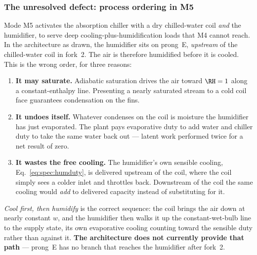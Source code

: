 \subsubsection{The unresolved defect: process ordering in M5}
Mode M5 activates the absorption chiller with a dry chilled-water coil \emph{and} the humidifier, to
serve deep cooling-plus-humidification loads that M4 cannot reach. In the architecture as drawn, the
humidifier sits on prong~E, \emph{upstream} of the chilled-water coil in fork~2. The air is therefore
humidified before it is cooled. This is the wrong order, for three reasons:
\begin{enumerate}[nosep]
\item \textbf{It may saturate.} Adiabatic saturation drives the air toward $\RH=1$ along a
constant-enthalpy line. Presenting a nearly saturated stream to a cold coil face guarantees
condensation on the fins.
\item \textbf{It undoes itself.} Whatever condenses on the coil is moisture the humidifier has just
evaporated. The plant pays evaporative duty to add water and chiller duty to take the same water back
out --- latent work performed twice for a net result of zero.
\item \textbf{It wastes the free cooling.} The humidifier's own sensible cooling,
Eq.~\eqref{eq:spec:humduty}, is delivered upstream of the coil, where the coil simply sees a colder
inlet and throttles back. Downstream of the coil the same cooling would \emph{add} to delivered
capacity instead of substituting for it.
\end{enumerate}

\emph{Cool first, then humidify} is the correct sequence: the coil brings the air down at nearly
constant $w$, and the humidifier then walks it up the constant-wet-bulb line to the supply state,
its own evaporative cooling counting toward the sensible duty rather than against it.
\textbf{The architecture does not currently provide that path} --- prong~E has no branch that
reaches the humidifier after fork~2.


